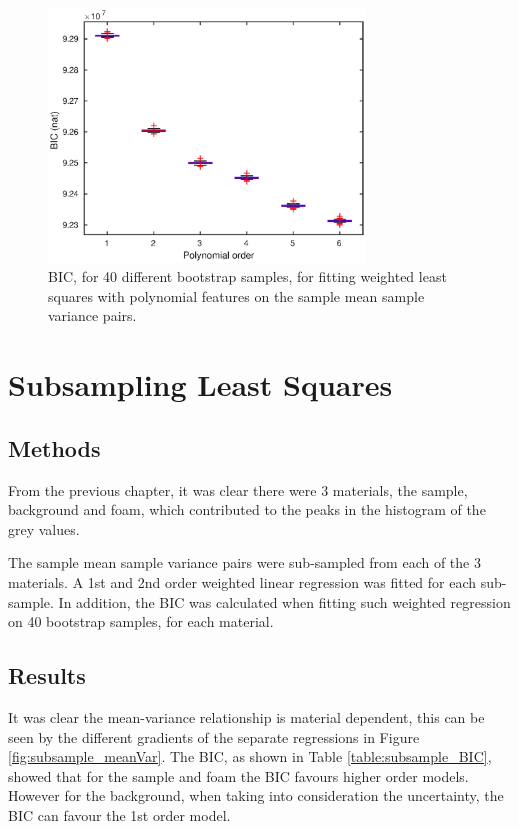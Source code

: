\documentclass[12pt]{report}
\begin{document}
\begin{figure}
	\centering
	\includegraphics[width=0.75\textwidth]{figures/meanVar/polynomialBIC.eps}
	\caption{BIC, for 40 different bootstrap samples, for fitting weighted least squares with polynomial features on the sample mean sample variance pairs.}
	\label{fig:weightedLS_BIC}
\end{figure}

\section{Subsampling Least Squares}
\subsection{Methods}
From the previous chapter, it was clear there were 3 materials, the sample, background and foam, which contributed to the peaks in the histogram of the grey values.

The sample mean sample variance pairs were sub-sampled from each of the 3 materials. A 1st and 2nd order weighted linear regression was fitted for each sub-sample. In addition, the BIC was calculated when fitting such weighted regression on 40 bootstrap samples, for each material.

\subsection{Results}

It was clear the mean-variance relationship is material dependent, this can be seen by the different gradients of the separate regressions in Figure \ref{fig:subsample_meanVar}. The BIC, as shown in Table \ref{table:subsample_BIC}, showed that for the sample and foam the BIC favours higher order models. However for the background, when taking into consideration the uncertainty, the BIC can favour the 1st order model.
\end{document}
